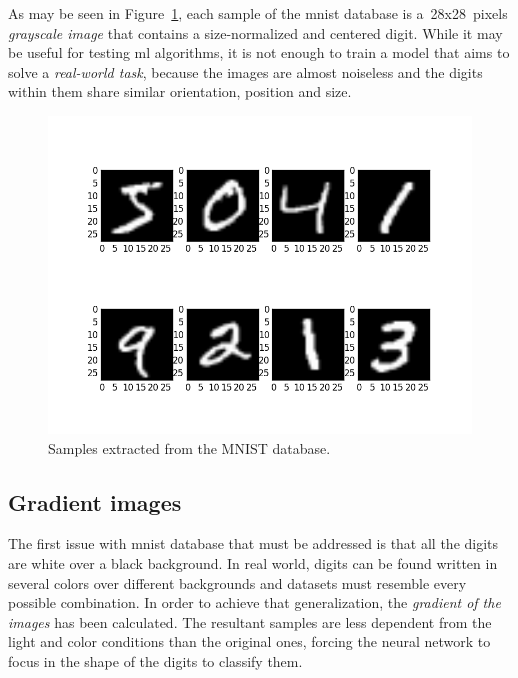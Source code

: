 As may be seen in Figure~\ref{fig:mnist}, each sample of the \gls{mnist} database is a~28x28~pixels \emph{grayscale image} that contains a size-normalized and centered digit. While it may be useful for testing \gls{ml} algorithms, it is not enough to train a model that aims to solve a \emph{real-world task}, because the images are almost noiseless and the digits within them share similar orientation, position and size.
\begin{figure}
	\centering
	\includegraphics[width=12cm, keepaspectratio]{figures/mnist.png}
	\caption{Samples extracted from the MNIST database.}
	\label{fig:mnist}
\end{figure}

\subsection{Gradient images}\label{subsec:edge}
The first issue with \gls{mnist} database that must be addressed is that all the digits are white over a black background. In real world, digits can be found written in several colors over different backgrounds and datasets must resemble every possible combination. In order to achieve that generalization, the \emph{gradient of the images} has been calculated. The resultant samples are less dependent from the light and color conditions than the original ones, forcing the neural network to focus in the shape of the digits to classify them.

